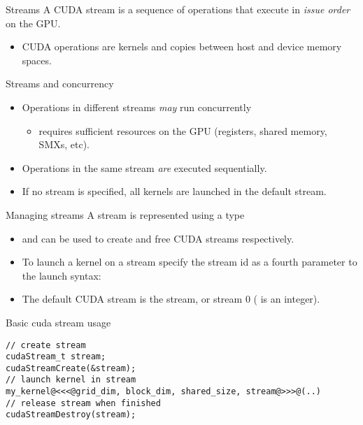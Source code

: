 \documentclass[aspectratio=43]{beamer}
\begin{document}
\begin{frame}[fragile]{Streams}
    A CUDA stream is a sequence of operations that execute in \emph{issue order} on the GPU.
    \begin{itemize}
        \item CUDA operations are kernels and copies between host and device memory spaces.
    \end{itemize}

    \begin{info}{Streams and concurrency}
        \begin{itemize}
            \item Operations in different streams \emph{may} run concurrently
            \begin{itemize}
                \item requires sufficient resources on the GPU (registers, shared memory, SMXs, etc).
            \end{itemize}
            \item Operations in the same stream \emph{are} executed sequentially.
            \item If no stream is specified, all kernels are launched in the default stream.
        \end{itemize}
    \end{info}

\end{frame}

\begin{frame}[fragile]{Managing streams}
    A stream is represented using a  type
    \begin{itemize}
        \item {} and  can be used to create and free CUDA streams respectively.
        \item To launch a kernel on a stream specify the stream id as a fourth parameter to the launch syntax: \\
            \begin{center}  \end{center}
        \item The default CUDA stream is the  stream, or stream 0 ( is an integer).
    \end{itemize}

    \begin{code}{Basic cuda stream usage}
        \begin{lstlisting}[style=boxcudatiny]
// create stream
cudaStream_t stream;
cudaStreamCreate(&stream);
// launch kernel in stream
my_kernel@<<<@grid_dim, block_dim, shared_size, stream@>>>@(..)
// release stream when finished
cudaStreamDestroy(stream);
        \end{lstlisting}
\end{code}

\end{frame}
\end{document}
